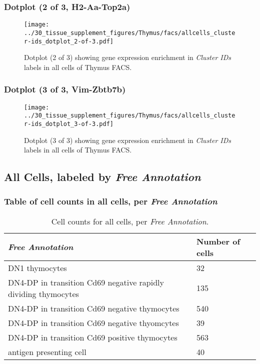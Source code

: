\clearpage

\subsubsection{Dotplot (2 of 3, H2-Aa-Top2a)}
\begin{figure}[h]
\centering
\texttt{[image: ../30\_tissue\_supplement\_figures/Thymus/facs/allcells\_cluster-ids\_dotplot\_2-of-3.pdf]}

\caption{ Dotplot (2 of 3)  showing gene expression enrichment in \emph{Cluster IDs} labels in all cells of Thymus FACS. }
\end{figure}


\clearpage

\subsubsection{Dotplot (3 of 3, Vim-Zbtb7b)}
\begin{figure}[h]
\centering
\texttt{[image: ../30\_tissue\_supplement\_figures/Thymus/facs/allcells\_cluster-ids\_dotplot\_3-of-3.pdf]}

\caption{ Dotplot (3 of 3)  showing gene expression enrichment in \emph{Cluster IDs} labels in all cells of Thymus FACS. }
\end{figure}


\clearpage

\subsection{All Cells, labeled by \emph{Free Annotation}}
\subsubsection{Table of cell counts in all cells, per \emph{Free Annotation}}\begin{table}[h]
\centering
\label{my-label}
\begin{tabular}{@{}ll@{}}
\toprule

\emph{Free Annotation}& Number of cells \\ \midrule
DN1 thymocytes & 32 \\

DN4-DP in transition Cd69 negative rapidly dividing thymocytes & 135 \\

DN4-DP in transition Cd69 negative thymocytes & 540 \\

DN4-DP in transition Cd69 negative thyomcytes & 39 \\

DN4-DP in transition Cd69 positive thymocytes & 563 \\

antigen presenting cell & 40 \\
\bottomrule
\end{tabular}
\caption{Cell counts for all cells, per \emph{Free Annotation}.}
\end{table}

